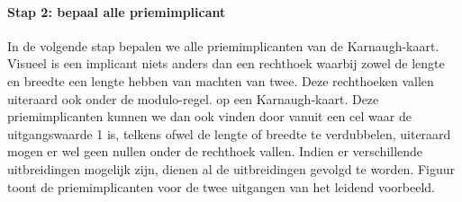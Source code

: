 \paragraph{Stap 2: bepaal alle priemimplicant} In de volgende stap bepalen we alle priemimplicanten van de Karnaugh-kaart. Visueel is een implicant niets anders dan een rechthoek waarbij zowel de lengte en breedte een lengte hebben van machten van twee. Deze rechthoeken vallen uiteraard ook onder de modulo-regel. op een Karnaugh-kaart. Deze priemimplicanten kunnen we dan ook vinden door vanuit een cel waar de uitgangswaarde 1 is, telkens ofwel de lengte of breedte te verdubbelen, uiteraard mogen er wel geen nullen onder de rechthoek vallen. Indien er verschillende uitbreidingen mogelijk zijn, dienen al de uitbreidingen gevolgd te worden. Figuur \label{fig:karnaughKaartenVoorbeeldPriemimplicanten} toont de priemimplicanten voor de twee uitgangen van het leidend voorbeeld.

